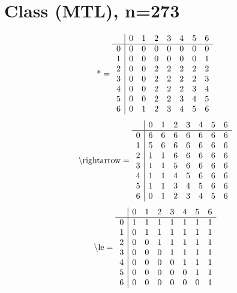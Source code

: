 \documentclass[11pt]{article}
\begin{document}
\section{Class (MTL), n=273}
\[\text{*} = 
\begin{array}{r | r r r r r r r}
 & 0 & 1 & 2 & 3 & 4 & 5 & 6 \\ \hline
0 & 0 & 0 & 0 & 0 & 0 & 0 & 0 \\
1 & 0 & 0 & 0 & 0 & 0 & 0 & 1 \\
2 & 0 & 0 & 2 & 2 & 2 & 2 & 2 \\
3 & 0 & 0 & 2 & 2 & 2 & 2 & 3 \\
4 & 0 & 0 & 2 & 2 & 2 & 3 & 4 \\
5 & 0 & 0 & 2 & 2 & 3 & 4 & 5 \\
6 & 0 & 1 & 2 & 3 & 4 & 5 & 6 \\
\end{array}
\]
\[\text{\textbackslash rightarrow} = 
\begin{array}{r | r r r r r r r}
 & 0 & 1 & 2 & 3 & 4 & 5 & 6 \\ \hline
0 & 6 & 6 & 6 & 6 & 6 & 6 & 6 \\
1 & 5 & 6 & 6 & 6 & 6 & 6 & 6 \\
2 & 1 & 1 & 6 & 6 & 6 & 6 & 6 \\
3 & 1 & 1 & 5 & 6 & 6 & 6 & 6 \\
4 & 1 & 1 & 4 & 5 & 6 & 6 & 6 \\
5 & 1 & 1 & 3 & 4 & 5 & 6 & 6 \\
6 & 0 & 1 & 2 & 3 & 4 & 5 & 6 \\
\end{array}
\]
\[\text{\textbackslash le} = 
\begin{array}{r | r r r r r r r}
 & 0 & 1 & 2 & 3 & 4 & 5 & 6 \\ \hline
0 & 1 & 1 & 1 & 1 & 1 & 1 & 1 \\
1 & 0 & 1 & 1 & 1 & 1 & 1 & 1 \\
2 & 0 & 0 & 1 & 1 & 1 & 1 & 1 \\
3 & 0 & 0 & 0 & 1 & 1 & 1 & 1 \\
4 & 0 & 0 & 0 & 0 & 1 & 1 & 1 \\
5 & 0 & 0 & 0 & 0 & 0 & 1 & 1 \\
6 & 0 & 0 & 0 & 0 & 0 & 0 & 1 \\
\end{array}
\]
\end{document}
